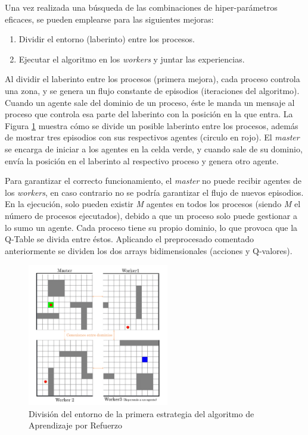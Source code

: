 		

		Una vez realizada una búsqueda de las combinaciones de hiper-parámetros eficaces, se pueden emplearse para las siguientes mejoras:
		
		\begin{enumerate}
			\item Dividir el entorno (laberinto) entre los procesos.
			\item Ejecutar el algoritmo en los \textit{workers} y juntar las experiencias.
		\end{enumerate}

	
		
		Al dividir el laberinto entre los procesos (primera mejora), cada proceso controla una zona, y se genera un flujo constante de episodios (iteraciones del algoritmo). Cuando un agente sale del dominio de un proceso, éste le manda un mensaje al proceso que controla esa parte del laberinto con la posición en la que entra. La Figura \ref{fig:rlmpi} muestra cómo se divide un posible laberinto entre los procesos, además de mostrar tres episodios con sus respectivos agentes (circulo en rojo). El \textit{master} se encarga de iniciar a los agentes en la celda verde, y cuando sale de su dominio, envía la posición en el laberinto al respectivo proceso y genera otro agente. 
		
		Para garantizar el correcto funcionamiento, el \textit{master} no puede recibir agentes de los \textit{workers}, en caso contrario no se podría garantizar el flujo de nuevos episodios. En la ejecución, solo pueden existir \textit{M} agentes en todos los procesos (siendo \textit{M} el número de procesos ejecutados), debido a que un proceso solo puede gestionar a lo sumo un agente. Cada proceso tiene su propio dominio, lo que provoca que la Q-Table se divida entre éstos. Aplicando el preprocesado comentado anteriormente se dividen los dos arrays bidimensionales (acciones y Q-valores). 
		
		
		
		\begin{figure}[!h]
			\centering
			\includegraphics[width=0.55\textwidth]{images/chapter_3/rl_mpi}	
			\caption{División del entorno de la primera estrategia del algoritmo de Aprendizaje por Refuerzo}
			\label{fig:rlmpi}
		\end{figure}
	
